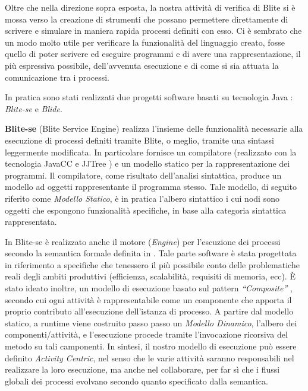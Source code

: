 Oltre che nella direzione sopra esposta, la nostra attività di verifica di
Blite si è mossa verso la creazione di strumenti che possano permettere
direttamente di scrivere e simulare in maniera rapida processi definiti con
esso. Ci è sembrato che un modo molto utile per verificare la funzionalità del
linguaggio creato, fosse quello di poter scrivere ed eseguire programmi e di avere una
rappresentazione, il più espressiva possibile, dell'avvenuta esecuzione e di
come si sia attuata la comunicazione tra i processi.

In pratica sono stati realizzati due progetti software basati su tecnologia
Java \cite{Java}: \emph{Blite-se} e \emph{Blide}. 

\textbf{Blite-se} (Blite Service Engine) realizza l'insieme delle funzionalità
necessarie alla esecuzione di processi definiti tramite Blite, o meglio, tramite
una sintassi leggermente modificata. In particolare fornisce un compilatore
(realizzato con la tecnologia JavaCC e JJTree \cite{JavaCC}) e un modello
statico per la rappresentazione dei programmi. Il compilatore, come risultato
dell'analisi sintattica, produce un modello ad oggetti rappresentante il programma stesso.
Tale modello, di seguito riferito come \emph{Modello Statico}, è in pratica
l'albero sintattico i cui nodi sono oggetti che espongono funzionalità
specifiche, in base alla categoria sintattica rappresentata.

In Blite-se è realizzato anche il motore (\emph{Engine}) per l'escuzione dei
processi secondo la semantica formale definita in \cite{LaPuTie1}. Tale parte software
è stata progettata in riferimento a specifiche che tenessero il più possibile
conto delle problematiche reali degli ambiti produttivi (efficienza,
scalabilità, requisiti di memoria, ecc). \`E stato ideato inoltre, un modello di
esecuzione basato sul pattern \emph{``Composite''} \cite{GANGo4}, secondo cui
ogni attività è rappresentabile come un componente che apporta il proprio contributo
all'esecuzione dell'istanza di processo. A partire dal modello statico, a
runtime viene costruito passo passo un \emph{Modello Dinamico}, l'albero dei
componenti/attività, e l'esecuzione procede tramite l'invocazione ricorsiva del
metodo  su tali camponenti. In sintesi, il nostro modello di
esecuzione può essere definito \emph{Activity Centric}, nel senso che le varie
attività saranno responsabili nel realizzare la loro esecuzione, ma anche nel
collaborare, per far sì che i flussi globali dei processi evolvano secondo
quanto specificato dalla semantica.

